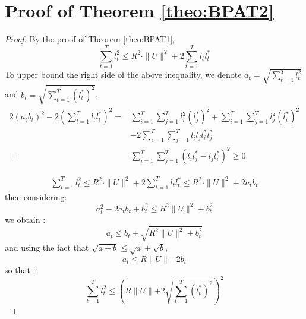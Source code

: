 \documentclass[preprint,12pt,authoryear]{elsarticle}
\begin{document}
\section{Proof of Theorem \ref{theo:BPAT2}}\label{app:thm2}
\begin{proof}
	By the proof of Theorem \ref{theo:BPAT1}, 
	\[\sum_{t=1}^{T}l_t^2 \leqslant R^2\cdot \parallel{U}\parallel^2 + 2\sum_{t=1}^{T}l_t l_t^{\ast}\]
	To upper bound the right side of the above inequality, we denote $a_t = \sqrt{\sum_{t=1}^{T}l_t^2}$ and $b_t = \sqrt{\sum_{t=1}^{T}(l_t^{\ast})^2}$, 
	\begin{align}
	2(a_tb_t)^2-2(\sum_{t=1}^{T}l_tl_t^{\ast})^2 =& \sum_{i=1}^{T}\sum_{j=1}^{T}l_i^2(l_j^{\ast})^2+\sum_{i=1}^{T}\sum_{j=1}^{T}l_j^2(l_i^{\ast})^2 \nonumber\\
	&- 2\sum_{i=1}^{T}\sum_{j=1}^{T}l_il_jl_i^{\ast}l_j^{\ast}\nonumber\\
	=& \sum_{i=1}^{T}\sum_{j=1}^{T}(l_il_j^{\ast}-l_jl_i^{\ast})^2 \geqslant 0 \nonumber
	\end{align}
	
	\begin{align}
	\sum_{t=1}^{T}l_t^2 \leqslant R^2 \cdot \parallel{U}\parallel^2+2\sum_{t=1}^{T}l_tl_t^{\ast}\leqslant R^2 \cdot \parallel{U}\parallel^2+2a_tb_t\nonumber
	\end{align}
	then considering:
	\[a_t^2 -2 a_tb_t+b_t^2\leqslant R^2\parallel{U}\parallel^2+b_t^2\]
	we obtain :
	\[a_t \leqslant b_t+\sqrt{R^2\parallel{U}\parallel^2+b_t^2}\]
	and using the fact that $\sqrt{a+b}\leqslant \sqrt{a}+\sqrt{b}$,
	\[a_t \leqslant R\parallel{U}\parallel+2 b_t\]
	so that :
	\[\sum_{t=1}^{T}l_t^2 \leqslant \left(R\parallel{U}\parallel+2 \sqrt{\sum_{t=1}^{T}(l_t^{\ast})^2}\right)^2 \]
\end{proof}
\end{document}
